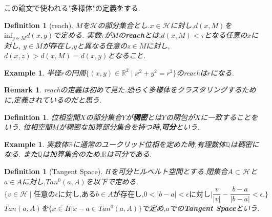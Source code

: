 \documentclass{jarticle}
\newtheorem{dfn}[thm]{Definition}
\newtheorem{epl}[thm]{Example}
\newtheorem*{rem}{Remark}
\begin{document}
この論文で使われる"多様体"の定義をする.
\begin{dfn}[reach]
  $M$を$\mathcal{H}$の部分集合とし.$x\in \mathcal{H}$に対し,$d(x,M)$を$\mathrm{inf}_{y \in M}d(x,y)$で定める.
  実数$\tau$が$M$の\textbf{reach}とは,$d(x,M)< \tau$となる任意の$x$に対し,
  $y\in M$が存在し,$y$と異なる任意の$z\in M$に対し,$d(x,z) > d(x,M)=d(x,y)$となること.
\end{dfn}
\begin{epl}
 半径$r$の円周$\{(x,y) \in \mathbb{R}^2 \mid x^2+y^2=r^2 \}$のreachは$r$になる.
\end{epl}
\begin{rem}
 reachの定義は初めて見た.恐らく多様体をクラスタリングするために,定義されているのだと思う.
\end{rem}
\begin{dfn}
 位相空間$X$の部分集合$Y$が\textbf{稠密}とは$Y$の閉包が$X$に一致することをいう.
 位相空間$M$が稠密な加算部分集合を持つ時,\textbf{可分}という.
\end{dfn}
\begin{epl}
 実数体$\mathbb{R}$に通常のユークリッド位相を定めた時,有理数体$\mathbb{Q}$は稠密になる.
 また$\mathbb{Q}$は加算集合のため,$\mathbb{R}$は可分である.
\end{epl}

\begin{dfn}[Tangent Space]
$H$を可分ヒルベルト空間とする.閉集合$A \subset \mathcal{H}$と$a \in A$に対し,$Tan^0(a,A)$を以下で定める.
\begin{equation*}
  \{ v \in \mathcal{H} \mid \mbox{任意の} \epsilon \mbox{に対し,ある} b \in A \mbox{が存在し,}
  0 <| b- a| < \epsilon \mbox{に対し} |\frac{v}{|v|} - \frac{b-a}{|b-a|} < \epsilon.\}
\end{equation*}
$Tan(a,A)$を$\{x \in H| x -a \in Tan^0(a,A)\}$で定め,$a$での\textbf{Tangent Space}という.
\end{dfn}
\end{document}
